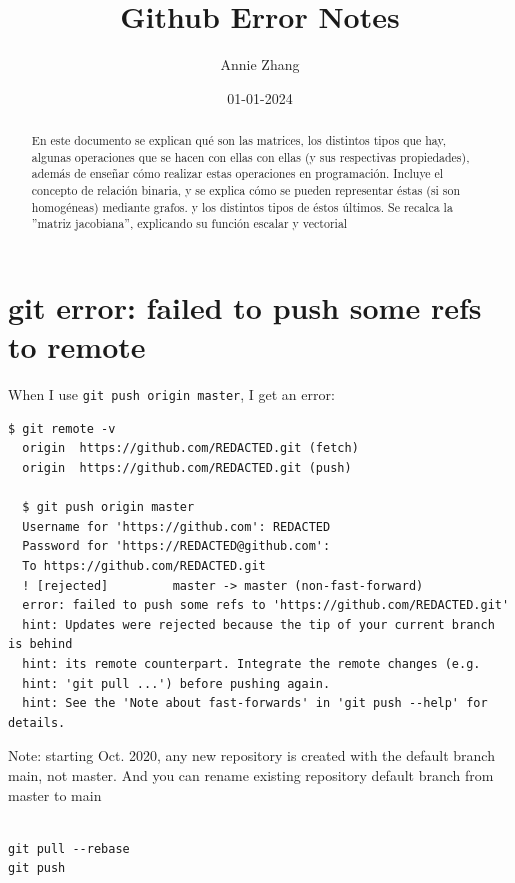 \documentclass[10pt]{article}
\title{Github Error Notes}
\author{Annie Zhang}
\date{01-01-2024}
\begin{document}
\maketitle \tableofcontents 


\begin{abstract}
En este documento se explican qué son las matrices, los distintos tipos que hay, algunas operaciones que se hacen con ellas con ellas (y sus respectivas propiedades), además de enseñar cómo realizar estas operaciones en programación. Incluye el concepto de relación binaria, y se explica cómo se pueden representar éstas (si son homogéneas) mediante grafos. y los distintos tipos de éstos últimos. Se recalca la ''matriz jacobiana'', explicando su función escalar y vectorial
\end{abstract}

\section{git error: failed to push some refs to remote}
When I use \texttt{git push origin master}, I get an error:
\begin{center}
\begin{lstlisting}[caption=Error message example]
  $ git remote -v
  origin  https://github.com/REDACTED.git (fetch)
  origin  https://github.com/REDACTED.git (push)
  
  $ git push origin master
  Username for 'https://github.com': REDACTED
  Password for 'https://REDACTED@github.com':
  To https://github.com/REDACTED.git
  ! [rejected]         master -> master (non-fast-forward)
  error: failed to push some refs to 'https://github.com/REDACTED.git'
  hint: Updates were rejected because the tip of your current branch is behind
  hint: its remote counterpart. Integrate the remote changes (e.g.
  hint: 'git pull ...') before pushing again.
  hint: See the 'Note about fast-forwards' in 'git push --help' for details.
  \end{lstlisting}
\end{center}

Note: starting Oct. 2020, any new repository is created with the default branch main, not master. And you can rename existing repository default branch from master to main 

\begin{center}
\begin{lstlisting}[caption=commands to fix]

git pull --rebase
git push
\end{lstlisting}
\end{center}
\end{document}
